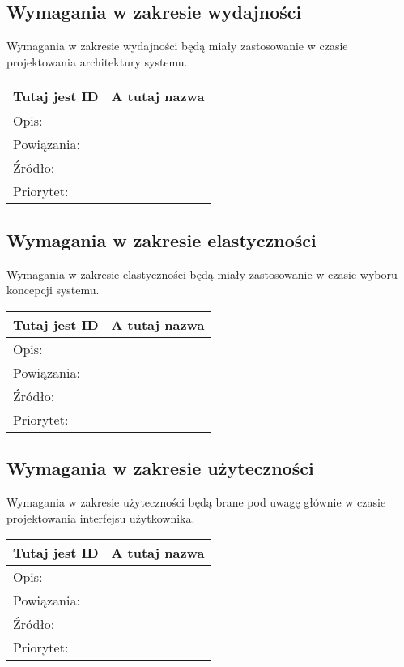 \documentclass[a4paper,10pt]{article}
\begin{document}
\subsection{Wymagania w zakresie wydajności}

Wymagania w zakresie wydajności będą miały zastosowanie w czasie projektowania architektury systemu.

\begin{center}
\begin{tabular}{|l|l|} \hline

Tutaj jest ID & A tutaj nazwa \\ \hline
Opis: &  \\ \hline
Powiązania: &  \\ \hline
Źródło: &  \\ \hline
Priorytet: &  \\ \hline

\end{tabular}
\end{center}

\subsection{Wymagania w zakresie elastyczności}

Wymagania w zakresie elastyczności będą miały zastosowanie w czasie wyboru koncepcji systemu.

\begin{center}
\begin{tabular}{|l|l|} \hline

Tutaj jest ID & A tutaj nazwa \\ \hline
Opis: &  \\ \hline
Powiązania: &  \\ \hline
Źródło: &  \\ \hline
Priorytet: &  \\ \hline

\end{tabular}
\end{center}

\subsection{Wymagania w zakresie użyteczności}

Wymagania w zakresie użyteczności będą brane pod uwagę głównie w czasie projektowania interfejsu użytkownika.

\begin{center}
\begin{tabular}{|l|l|} \hline

Tutaj jest ID & A tutaj nazwa \\ \hline
Opis: &  \\ \hline
Powiązania: &  \\ \hline
Źródło: &  \\ \hline
Priorytet: &  \\ \hline

\end{tabular}
\end{center}
\end{document}
